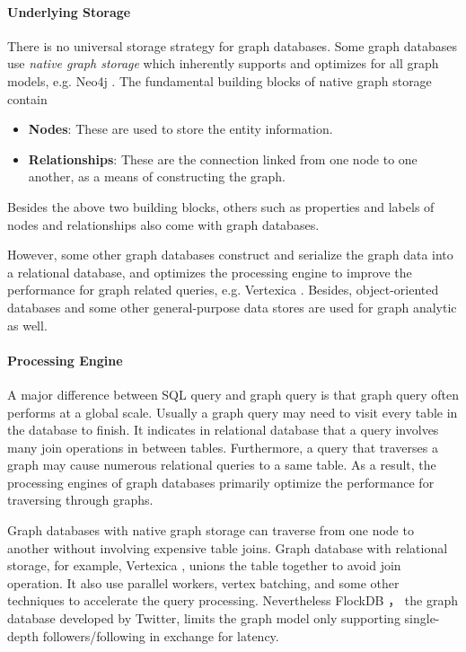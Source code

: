 \documentclass[letterpaper,twocolumn,11pt]{article}
\begin{document}
\paragraph{Underlying Storage} There is no universal storage strategy for graph databases. Some graph databases use {\it native graph storage} which inherently supports and optimizes for all graph models, e.g. Neo4j \cite{van2014learning}. The fundamental building blocks of native graph storage contain
\begin{itemize}
\item {\bf Nodes}: These are used to store the entity information.
\item {\bf Relationships}: These are the connection linked from one node to one another, as a means of constructing the graph.
\end{itemize}
Besides the above two building blocks, others such as properties and labels of nodes and relationships also come with graph databases.

However, some other graph databases construct and serialize the graph data into a relational database, and optimizes the processing engine to improve the performance for graph related queries, e.g. Vertexica \cite{jindal2014vertexica}. Besides, object-oriented databases and some other general-purpose data stores are used for graph analytic as well.

\paragraph{Processing Engine} A major difference between SQL query and graph query is that graph query often performs at a global scale. Usually a graph query may need to visit every table in the database to finish. It indicates in relational database that a query involves many join operations in between tables. Furthermore, a query that traverses a graph may cause numerous relational queries to a same table. As a result, the processing engines of graph databases primarily optimize the performance for traversing through graphs.

Graph databases with native graph storage can traverse from one node to another without involving expensive table joins. Graph database with relational storage, for example, Vertexica \cite{jindal2014vertexica}, unions the table together to avoid join operation. It also use parallel workers, vertex batching, and some other techniques to accelerate the query processing. Nevertheless FlockDB \cite{flockdb}， the graph database developed by Twitter, limits the graph model only supporting single-depth followers/following in exchange for latency.
\end{document}
